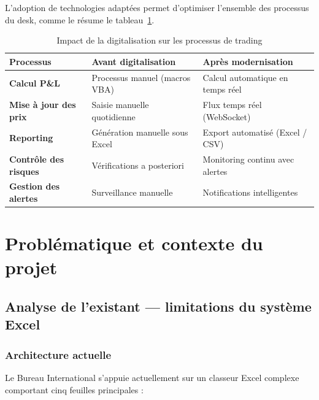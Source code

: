 \hspace{1cm} L'adoption de technologies adaptées permet d'optimiser l'ensemble des processus du desk, comme le résume le tableau~\ref{tab:impact_digitalisation}.

\begin{table}[H]
\centering
\renewcommand{\arraystretch}{1.4}
\begin{tabularx}{\textwidth}{>{\bfseries}l X X}
\toprule
Processus & \textbf{Avant digitalisation} & \textbf{Après modernisation} \\
\midrule
Calcul P\&L          & Processus manuel (macros VBA)  & Calcul automatique en temps réel \\
Mise à jour des prix & Saisie manuelle quotidienne    & Flux temps réel (WebSocket) \\
Reporting            & Génération manuelle sous Excel & Export automatisé (Excel / CSV) \\
Contrôle des risques & Vérifications a posteriori     & Monitoring continu avec alertes \\
Gestion des alertes  & Surveillance manuelle          & Notifications intelligentes \\
\bottomrule
\end{tabularx}
\caption{Impact de la digitalisation sur les processus de trading}
\label{tab:impact_digitalisation}
\end{table}

\section{Problématique et contexte du projet}

\subsection{Analyse de l'existant --- limitations du système Excel}

\subsubsection{Architecture actuelle}

\hspace{1cm} Le Bureau International s'appuie actuellement sur un classeur Excel complexe comportant cinq feuilles principales :

